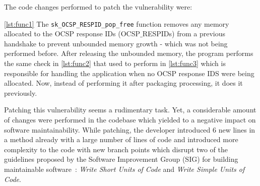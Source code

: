 \documentclass[10pt,conference]{IEEEtran}
\newcommand\Sof[1]{\nb{Sofia}{red}{#1}}
\begin{document}
The code changes performed to patch the vulnerability were:

\ref{lst:func1} The \texttt{sk\_OCSP\_RESPID\_pop\_free} function removes any
memory allocated to the OCSP response IDs (OCSP$\_$RESPIDs) from a previous handshake to prevent unbounded memory growth - which was not being performed before.
After releasing the unbounded memory, the program performs the same check 
in \ref{lst:func2} that used to perform in \ref{lst:func3} which is responsible 
for handling the application when no OCSP response IDS were being allocated. Now, instead of performing it after packaging processing, it does it previously.

Patching this vulnerability seems a rudimentary task. Yet,
a considerable amount of changes were performed
in the codebase which yielded to a negative impact on software maintainability.
While patching, the developer introduced $6$ new lines in a method already with 
a large number of lines of code and introduced more complexity to the code
with new branch points which disrupt two of the guidelines proposed by the Software Improvement Group 
(SIG) for building maintainable software~\cite{Visser:2016:OREILLY}: \emph{Write Short Units of Code}
and \emph{Write Simple Units of Code}. 

\end{document}
